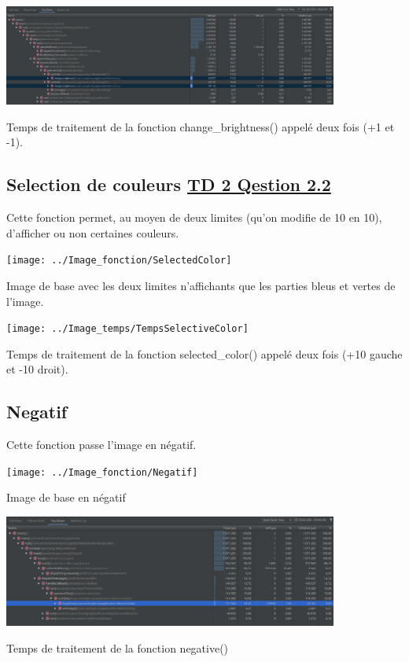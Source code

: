\documentclass{article}
\begin{document}
\begin{center} 
    \includegraphics[width=11cm]{../Image_temps/TempsChangeBrightness}

    Temps de traitement de la fonction change_brightness() appelé deux fois (+1 et -1).
\end{center}

\subsection{Selection de couleurs \underline{TD 2 Qestion 2.2}}
Cette fonction permet, au moyen de deux limites (qu'on modifie de 10 en 10), d'afficher ou non certaines couleurs.
\bigbreak

\begin{center} 
    \texttt{[image: ../Image\_fonction/SelectedColor]}

    Image de base avec les deux limites n'affichants que les parties bleus et vertes de l'image.
\end{center}

\begin{center} 
    \texttt{[image: ../Image\_temps/TempsSelectiveColor]}

    Temps de traitement de la fonction selected_color() appelé deux fois (+10 gauche et -10 droit).
\end{center}

\subsection{Negatif}
Cette fonction passe l'image en négatif.
\bigbreak

\begin{center} 
    \texttt{[image: ../Image\_fonction/Negatif]}

    Image de base en négatif
\end{center}

\begin{center} 
    \includegraphics[width=11cm]{../Image_temps/TempsNegative}

    Temps de traitement de la fonction negative()
\end{center}
\end{document}
